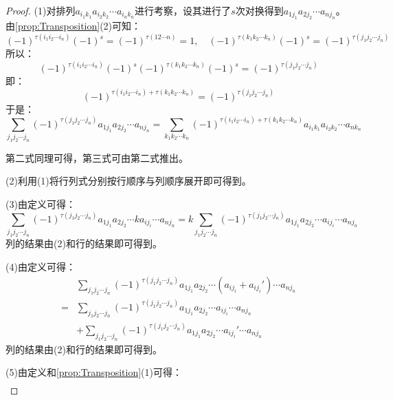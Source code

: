 \begin{proof}
	(1)对排列$a_{i_1k_1}a_{i_2k_2}\cdots a_{i_nk_n}$进行考察，设其进行了$s$次对换得到$a_{1j_1}a_{2j_2}\cdots a_{nj_n}$。由\cref{prop:Transposition}(2)可知：
	\begin{equation*}
		(-1)^{\tau(i_1i_2\cdots i_n)}(-1)^{s}=(-1)^{\tau(12\cdots n)}=1,\quad
		(-1)^{\tau(k_1k_2\cdots k_n)}(-1)^{s}=(-1)^{\tau(j_1j_2\cdots j_n)}
	\end{equation*}
	所以：
	\begin{equation*}
		(-1)^{\tau(i_1i_2\cdots i_n)}(-1)^{s}(-1)^{\tau(k_1k_2\cdots k_n)}(-1)^{s}=(-1)^{\tau(j_1j_2\cdots j_n)}
	\end{equation*}
	即：
	\begin{equation*}
		(-1)^{\tau(i_1i_2\cdots i_n)+\tau(k_1k_2\cdots k_n)}=(-1)^{\tau(j_1j_2\cdots j_n)}
	\end{equation*}
	于是：
	\begin{equation*}
		\sum_{j_1j_2\cdots j_n}^{}(-1)^{\tau(j_1j_2\cdots j_n)}a_{1j_1}a_{2j_2}\cdots a_{nj_n}=\sum_{k_1k_2\cdots k_n}^{}(-1)^{\tau(i_1i_2\cdots i_n)+\tau(k_1k_2\cdots k_n)}a_{i_1k_1}a_{i_2k_2}\cdots a_{nk_n}
	\end{equation*}\par
	第二式同理可得，第三式可由第二式推出。\par
	(2)利用(1)将行列式分别按行顺序与列顺序展开即可得到。\par
	(3)由定义可得：
	\begin{equation*}
		\sum_{j_1j_2\cdots j_n}^{}(-1)^{\tau(j_1j_2\cdots j_n)}a_{1j_1}a_{2j_2}\cdots ka_{ij_i}\cdots a_{nj_n}=k\sum_{j_1j_2\cdots j_n}^{}(-1)^{\tau(j_1j_2\cdots j_n)}a_{1j_1}a_{2j_2}\cdots a_{ij_i}\cdots a_{nj_n}
	\end{equation*}
	列的结果由(2)和行的结果即可得到。\par
	(4)由定义可得：
	\begin{align*}
		&\sum_{j_1j_2\cdots j_n}^{}(-1)^{\tau(j_1j_2\cdots j_n)}a_{1j_1}a_{2j_2}\cdots (a_{ij_i}+a_{ij_i}')\cdots a_{nj_n} \\
		=&\sum_{j_1j_2\cdots j_n}^{}(-1)^{\tau(j_1j_2\cdots j_n)}a_{1j_1}a_{2j_2}\cdots a_{ij_i}\cdots a_{nj_n} \\
		&+\sum_{j_1j_2\cdots j_n}^{}(-1)^{\tau(j_1j_2\cdots j_n)}a_{1j_1}a_{2j_2}\cdots a_{ij_i}'\cdots a_{nj_n}
	\end{align*}
	列的结果由(2)和行的结果即可得到。\par
	(5)由定义和\cref{prop:Transposition}(1)可得：
	\begin{align*}

\end{align*}
\end{proof}
